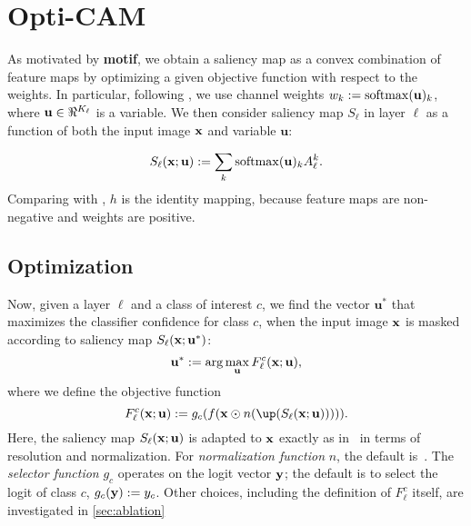 \section{Opti-CAM}
As motivated by \textbf{motif}, we obtain a saliency map as a convex combination of feature maps by
 optimizing a given objective function with respect to the weights.
In particular, following \citep{wang2020score}, we use channel weights $w_k \mathrel{:=} \operatorname{softmax}(\mathbf{u})_k$,
 where $\mathbf{u} \in \real^{K_\ell}$ is a variable.
We then consider saliency map $S_\ell$ in layer $\ell$ as a function of both the input image $\mathbf{x}$ 
and variable $\mathbf{u}$:

\begin{equation}
    S_\ell(\mathbf{x}; \mathbf{u}) \mathrel{:=} \sum_k \operatorname{softmax}(\mathbf{u})_k A^k_\ell.
\label{eq:v-sal}
\end{equation}
Comparing with , $h$ is the identity mapping, because feature maps are non-negative and weights are positive.


\subsection{Optimization}

Now, given a layer $\ell$ and a class of interest $c$, we find the vector $\mathbf{u}^*$ that maximizes 
the classifier confidence for class $c$, when the input image $\mathbf{x}$ is masked according to saliency map 
$S_\ell(\mathbf{x}; \mathbf{u}^*)$:
\begin{equation}
	\mathbf{u}^* \mathrel{:=} \arg\max_{\mathbf{u}} F^c_\ell(\mathbf{x}; \mathbf{u}),
\label{eq:opt}
\end{equation}
where we define the objective function
\begin{equation}
	F^c_\ell(\vx; \mathbf{u}) \defn g_c(f(\vx \odot n(\up(S_\ell(\vx; \mathbf{u}))))).
\label{eq:obj}
\end{equation}
Here, the saliency map $S_\ell(\mathbf{x}; \mathbf{u})$ is adapted to $\mathbf{x}$ exactly as in~ in 
terms of resolution and normalization. For \emph{normalization function} $n$, the default is~. 
The \emph{selector function} $g_c$ operates on the logit vector $\mathbf{y}$; the default is to select the logit 
of class $c$, \ie $g_c(\mathbf{y}) \mathrel{:=} y_c$. Other choices, including the definition of $F^c_\ell$ itself, are 
investigated in \autoref{sec:ablation} 

